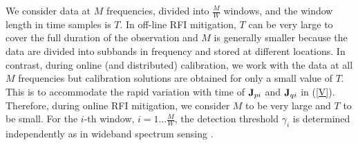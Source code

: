 \documentclass[conference]{IEEEtran}
\begin{document}
We consider data at $M$ frequencies, divided into $\frac{M}{W}$ windows, and the window length in time samples is $T$. In off-line RFI mitigation, $T$ can be very large to cover the full duration of the observation and $M$ is generally smaller because the data are divided into subbands in frequency and stored at different locations. In contrast, during online (and distributed) calibration, we work with the data at all $M$ frequencies but calibration solutions are obtained for only a small value of $T$. This is to accommodate the rapid variation with time of ${\bf J}_{pi}$ and ${\bf J}_{qi}$ in (\ref{V}). Therefore, during online RFI mitigation, we consider $M$ to be very large and $T$ to be small. For the $i$-th window, $i=1\ldots \frac{M}{W}$, the detection threshold $\gamma_i$ is determined independently as in wideband spectrum sensing \cite{Quan}.
\end{document}
